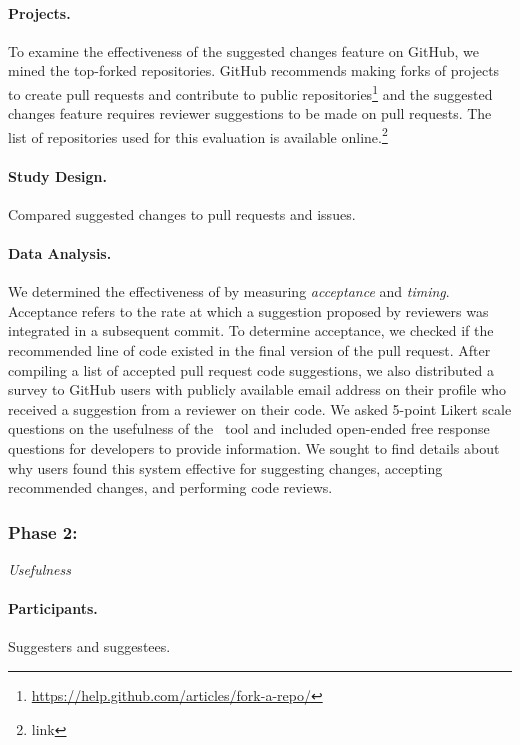 \paragraph{Projects.}

To examine the effectiveness of the suggested changes feature on GitHub, we mined the top-forked repositories. GitHub recommends making forks of projects to create pull requests and contribute to public repositories\footnote{\url{https://help.github.com/articles/fork-a-repo/}} and the suggested changes feature requires reviewer suggestions to be made on pull requests. The list of repositories used for this evaluation is available online.\footnote{link}

\paragraph{Study Design.} Compared suggested changes to pull requests and issues.

\paragraph{Data Analysis.}

We determined the effectiveness of \SUGGS by measuring \textit{acceptance} and \textit{timing}. Acceptance refers to the rate at which a suggestion proposed by reviewers was integrated in a subsequent commit. To determine acceptance, we checked if the recommended line of code existed in the final version of the pull request. After compiling a list of accepted pull request code suggestions, we also distributed a survey to GitHub users with publicly available email address on their profile who received a suggestion from a reviewer on their code. We asked 5-point Likert scale questions on the usefulness of the \SUGGS~tool and included open-ended free response questions for developers to provide information. We sought to find details about why users found this system effective for suggesting changes, accepting recommended changes, and performing code reviews. \\

\subsubsection{Phase 2:} \textit{Usefulness}

\paragraph{Participants.} Suggesters and suggestees.

